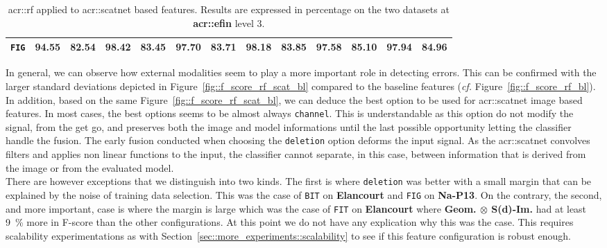 \begin{sidewaystable}[htpb]
\begin{tabular}{| c | c c | c c | c c | c c | c c | c c |}
                    \hline
                    \texttt{FIG} & 94.55 & 82.54 & 98.42 & 83.45 & 97.70 & 83.71 & 98.18 & 83.85 & 97.58 & 85.10 & \textbf{97.94} & \textbf{84.96} \\
                    \hline
                \end{tabular}
                \caption{
                    \label{tab::stats_scat_rf_f3}
                    \gls{acr::rf} applied to \gls{acr::scatnet} based features.
                    Results are expressed in percentage on the two datasets at \textbf{\gls{acr::efin}} level 3.
                }
            \end{sidewaystable}
            
            In general, we can observe how external modalities seem to play a more important role in detecting errors.
            This can be confirmed with the larger standard deviations depicted in Figure~\ref{fig::f_score_rf_scat_bl} compared to the baseline features (\textit{cf.} Figure~\ref{fig::f_score_rf_bl}).\\

            In addition, based on the same Figure~\ref{fig::f_score_rf_scat_bl}, we can deduce the best option to be used for \gls{acr::scatnet} image based features.
            In most cases, the best options seems to be almost always \texttt{channel}.
            This is understandable as this option do not modify the signal, from the get go, and preserves both the image and model informations until the last possible opportunity letting the classifier handle the fusion.
            The early fusion conducted when choosing the \texttt{deletion} option deforms the input signal.
            As the \gls{acr::scatnet} convolves filters and applies non linear functions to the input, the classifier cannot separate, in this case, between information that is derived from the image or from the evaluated model.\\
            
            There are however exceptions that we distinguish into two kinds.
            The first is where \texttt{deletion} was better with a small margin that can be explained by the noise of training data selection.
            This was the case of \texttt{BIT} on \textbf{Elancourt} and \texttt{FIG} on \textbf{Na-P13}.
            On the contrary, the second, and more important, case is where the margin is large which was the case of \texttt{FIT} on \textbf{Elancourt} where \textbf{Geom. \(\otimes\) S(d)-Im.} had at least \SI{9}{\percent} more in F-score than the other configurations.
            At this point we do not have any explication why this was the case.
            This requires scalability experimentations as with Section~\ref{sec::more_experiments::scalability} to see if this feature configuration is robust enough.\\

